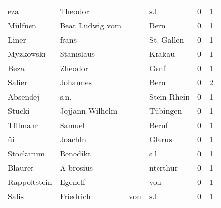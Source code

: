 \begin{center}
\begin{tiny}
\begin{longtabu}{llllrr}
                      eza &                            Theodor &             &                                        s.l. &          0 &         1 \\
                  Mülfnen &                    Beat Ludwig vom &             &                                        Bern &          0 &         1 \\
                    Liner &                              frans &             &                                  St. Gallen &          0 &         1 \\
                Myzkowski &                         Stanislaus &             &                                      Krakau &          0 &         1 \\
                     Beza &                            Zheodor &             &                                        Genf &          0 &         1 \\
                   Salier &                           Johannes &             &                                        Bern &          0 &         2 \\
                 Absendej &                               s.n. &             &                                 Stein Rhein &          0 &         1 \\
                   Stucki &                    Jojjann Wilhelm &             &                                    Tübingen &          0 &         1 \\
                 Tlllmanr &                             Samuel &             &                                       Beruf &          0 &         1 \\
                       üi &                            Joachln &             &                                      Glarus &          0 &         1 \\
                Stockarum &                           Benedikt &             &                                        s.l. &          0 &         1 \\
                  Blaurer &                          A brosius &             &                                    nterthur &          0 &         1 \\
             Rappoltstein &                            Egenelf &             &                                         von &          0 &         1 \\
                    Salis &                          Friedrich &         von &                                        s.l. &          0 &         1 \\

\end{longtabu}
\end{tiny}
\end{center}
